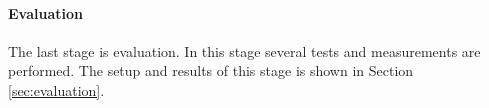 
\paragraph{Evaluation} The last stage is evaluation. In this stage several tests and measurements are performed. The setup and results of this stage is shown in Section \ref{sec:evaluation}.



